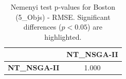 \begin{table}[h!]
\centering
\scriptsize
\begin{tabular}{lc}
\toprule
 & NT\_NSGA-II \\
\midrule
\textbf{NT\_NSGA-II} & 1.000 \\
\bottomrule
\end{tabular}
\caption{Nemenyi test p-values for Boston (5_Objs) - RMSE. Significant differences ($p < 0.05$) are highlighted.}
\label{tab:nemenyi_nemenyi_Boston_5_Objs_Test_RMSE}
\end{table}
